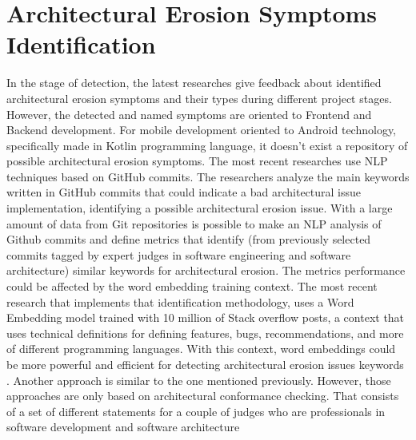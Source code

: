 \section{Architectural Erosion Symptoms Identification}
In the stage of detection, the latest researches give feedback about identified architectural erosion symptoms and their types during different project stages. However, the detected and named symptoms are oriented to Frontend and Backend development. For mobile development oriented to Android technology, specifically made in Kotlin programming language, it doesn't exist a repository of possible architectural erosion symptoms. The most recent researches use NLP techniques based on GitHub commits. The researchers analyze the main keywords written in GitHub commits that could indicate a bad architectural issue implementation, identifying a possible architectural erosion issue.
With a large amount of data from Git repositories is possible to make an NLP analysis of Github commits and define metrics that identify (from previously selected commits tagged by expert judges in software engineering and software architecture) similar keywords for architectural erosion. The metrics performance could be affected by the word embedding training context. The most recent research that implements that identification methodology, uses a Word Embedding model trained with 10 million of Stack overflow posts, a context that uses technical definitions for defining features, bugs, recommendations, and more of different programming languages. With this context, word embeddings could be more powerful and efficient for detecting architectural erosion issues keywords \cite{warnings-architectural-erosion,so-word-embedding}.
Another approach is similar to the one mentioned previously. However, those approaches are only based on architectural conformance checking. That consists of a set of different statements for a couple of judges who are professionals in software development and software architecture


